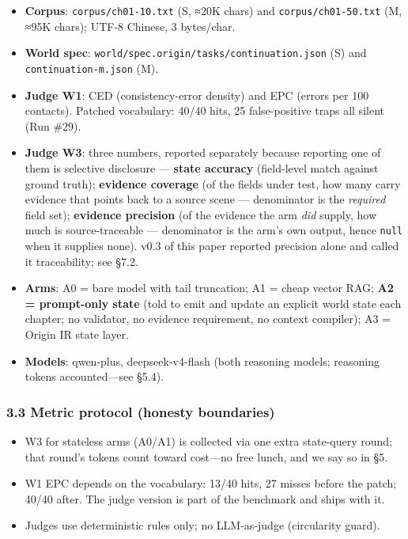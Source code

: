 \documentclass[
  english,
]{article}
\newcounter{none} %
\providecommand{\tightlist}{%
  \setlength{\itemsep}{0pt}\setlength{\parskip}{0pt}}
\begin{document}
\begin{itemize}
\tightlist
\item
  \textbf{Corpus}: \texttt{corpus/ch01-10.txt} (S, ≈20K chars) and
  \texttt{corpus/ch01-50.txt} (M, ≈95K chars); UTF-8 Chinese, 3
  bytes/char.
\item
  \textbf{World spec}:
  \texttt{world/spec.origin/tasks/continuation.json} (S) and
  \texttt{continuation-m.json} (M).
\item
  \textbf{Judge W1}: CED (consistency-error density) and EPC (errors per
  100 contacts). Patched vocabulary: 40/40 hits, 25 false-positive traps
  all silent (Run \#29).
\item
  \textbf{Judge W3}: three numbers, reported separately because
  reporting one of them is selective disclosure --- \textbf{state
  accuracy} (field-level match against ground truth); \textbf{evidence
  coverage} (of the fields under test, how many carry evidence that
  points back to a source scene --- denominator is the \emph{required}
  field set); \textbf{evidence precision} (of the evidence the arm
  \emph{did} supply, how much is source-traceable --- denominator is the
  arm's own output, hence \texttt{null} when it supplies none). v0.3 of
  this paper reported precision alone and called it traceability; see
  §7.2.
\item
  \textbf{Arms}: A0 = bare model with tail truncation; A1 = cheap vector
  RAG; \textbf{A2 = prompt-only state} (told to emit and update an
  explicit world state each chapter; no validator, no evidence
  requirement, no context compiler); A3 = Origin IR state layer.
\item
  \textbf{Models}: qwen-plus, deepseek-v4-flash (both reasoning models;
  reasoning tokens accounted---see §5.4).
\end{itemize}

\subsubsection{3.3 Metric protocol (honesty
boundaries)}\label{metric-protocol-honesty-boundaries}

\begin{itemize}
\tightlist
\item
  W3 for stateless arms (A0/A1) is collected via one extra state-query
  round; that round's tokens count toward cost---no free lunch, and we
  say so in §5.
\item
  W1 EPC depends on the vocabulary: 13/40 hits, 27 misses before the
  patch; 40/40 after. The judge version is part of the benchmark and
  ships with it.
\item
  Judges use deterministic rules only; no LLM-as-judge (circularity
  guard).
\end{itemize}
\end{document}
